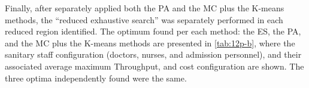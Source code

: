 \documentclass[11pt]{article} %
\begin{document}

Finally, after separately applied both the PA and the MC plus the
K-means methods, the \textquotedblleft{}reduced exhaustive search\textquotedblright{}
was separately performed in each reduced region identified. The optimum
found per each method: the ES, the PA, and the MC plus the K-means
methods are presented in \ref{tab:12p-b}, where the sanitary staff
configuration (doctors, nurses, and admission personnel), and their
associated average maximum Throughput, and cost configuration are
shown. The three optima independently found were the same.
\end{document}
